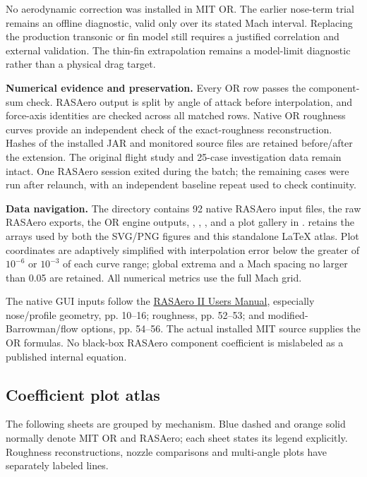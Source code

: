 \documentclass[oneside,openany]{amsdtx}
\begin{document}
No aerodynamic correction was installed in MIT OR. The earlier nose-term trial remains an offline diagnostic, valid only over its stated Mach interval. Replacing the production transonic or fin model still requires a justified correlation and external validation. The thin-fin extrapolation remains a model-limit diagnostic rather than a physical drag target.

\textbf{Numerical evidence and preservation.} Every OR row passes the component-sum check. RASAero output is split by angle of attack before interpolation, and force-axis identities are checked across all matched rows. Native OR roughness curves provide an independent check of the exact-roughness reconstruction. Hashes of the installed JAR and monitored source files are retained before/after the extension. The original flight study and 25-case investigation data remain intact. One RASAero session exited during the batch; the remaining cases were run after relaunch, with an independent baseline repeat used to check continuity.

\textbf{Data navigation.} The  directory contains 92 native RASAero input files, the raw RASAero exports, the OR engine outputs, , , , and a plot gallery in .  retains the arrays used by both the SVG/PNG figures and this standalone LaTeX atlas. Plot coordinates are adaptively simplified with interpolation error below the greater of $10^{-6}$ or $10^{-3}$ of each curve range; global extrema and a Mach spacing no larger than 0.05 are retained. All numerical metrics use the full Mach grid.

The native GUI inputs follow the \href{https://www.rasaero.com/dloads/RASAero\%20II\%20Users\%20Manual.pdf}{RASAero II Users Manual}, especially nose/profile geometry, pp. 10--16; roughness, pp. 52--53; and modified-Barrowman/flow options, pp. 54--56. The actual installed MIT source supplies the OR formulas. No black-box RASAero component coefficient is mislabeled as a published internal equation.


\clearpage\subsection{Coefficient plot atlas}

The following sheets are grouped by mechanism. Blue dashed and orange solid normally denote MIT OR and RASAero; each sheet states its legend explicitly. Roughness reconstructions, nozzle comparisons and multi-angle plots have separately labeled lines.
\end{document}
